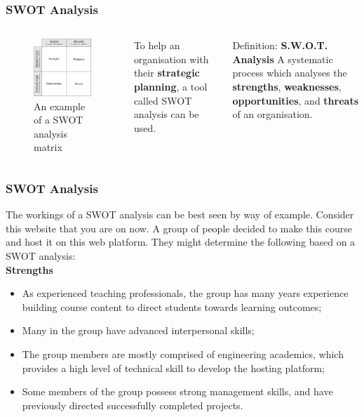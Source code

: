 \documentclass[aspectratio=169]{beamer}
\begin{document}
\begin{frame}
\frametitle{SWOT Analysis}
\begin{columns}
\begin{figure}
\includegraphics[scale=0.7]{SWOT}
\caption{An example of a SWOT analysis matrix}
\end{figure}
To help an organisation with their \textbf{strategic planning}, a tool called SWOT analysis can be used.
\vspace{0.5cm}
 
\begin{block}{Definition: \textbf{S.W.O.T. Analysis}}
A systematic process which analyses the \textbf{strengths}, \textbf{weaknesses}, \textbf{opportunities}, and \textbf{threats} of an organisation.
\end{block}
\end{columns}
\end{frame}

\begin{frame}
\frametitle{SWOT Analysis}
The workings of a SWOT analysis can be best seen by way of example. Consider this website that you are on now. A group of people decided to make this course and host it on this web platform. They might determine the following based on a SWOT analysis:\\
\vspace{0.5cm}
\textbf{Strengths}
\begin{itemize}
\item As experienced teaching professionals, the group has many years experience building course content to direct students towards learning outcomes;
\item Many in the group have advanced interpersonal skills;
\item The group members are mostly comprised of engineering academics, which provides a high level of technical skill to develop the hosting platform;
\item Some members of the group possess strong management skills, and have previously directed successfully completed projects.
\end{itemize}
\end{frame}
\end{document}

